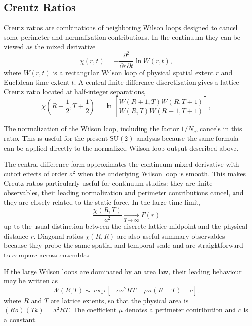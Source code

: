 \documentclass[12pt,a4paper,oneside,numbers=noenddot]{scrreprt}
\newcommand{\SU}{\mathrm{SU}}
\newcommand{\latspacing}{a}
\newcommand{\stringtension}{\sigma}
\begin{document}
\subsection{Creutz Ratios}
\label{subsec:creutz-ratios}

Creutz ratios are combinations of neighboring Wilson loops designed to cancel
some perimeter and normalization contributions. In the continuum they can be
viewed as the mixed derivative
\begin{equation}
  \chi(r,t)
  =
  -
  \frac{\partial^2}{\partial r\,\partial t}
  \ln W(r,t),
  \label{eq:continuum-creutz-ratio}
\end{equation}
where $W(r,t)$ is a rectangular Wilson loop of physical spatial extent $r$ and
Euclidean time extent $t$. A central finite-difference discretization gives a
lattice Creutz ratio located at half-integer separations,
\begin{equation}
  \chi\left(R+\frac{1}{2},T+\frac{1}{2}\right)
  =
  \ln
  \left[
    \frac{
      W(R+1,T) W(R,T+1)
    }{
      W(R,T) W(R+1,T+1)
    }
  \right],
  \label{eq:creutz-ratio-central-difference}
\end{equation}

The normalization of the Wilson loop, including the factor $1/N_c$, cancels in
this ratio. This is useful for the present $\SU(2)$ analysis because the same
formula can be applied directly to the normalized Wilson-loop output described
above.

The central-difference form approximates the continuum mixed derivative with
cutoff effects of order $\latspacing^2$ when the underlying Wilson loop is
smooth. This makes Creutz ratios particularly useful for continuum studies:
they are finite observables, their leading normalization and perimeter
contributions cancel, and they are closely related to the static force. In the
large-time limit,
\begin{equation}
  \frac{\chi(R,T)}{\latspacing^2}
  \xrightarrow[T\to\infty]{}
  F(r)
\end{equation}
up to the usual distinction between the discrete lattice midpoint and the
physical distance $r$. Diagonal ratios $\chi(R,R)$ are also useful summary
observables because they probe the same spatial and temporal scale and are
straightforward to compare across ensembles \cite{Creutz1980,Risch2024SmearingContinuum}.

If the large Wilson loops are dominated by an area law, their leading behaviour
may be written as
\begin{equation}
  W(R,T)
  \sim
  \exp\!\left[
    -\stringtension \latspacing^2 R T
    - \mu \latspacing (R+T)
    - c
  \right],
  \label{eq:wilson-loop-area-law}
\end{equation}
where \(R\) and \(T\) are lattice extents, so that the physical area is
\((R\latspacing)(T\latspacing)=\latspacing^2RT\). The coefficient
\(\mu\) denotes a perimeter contribution and \(c\) is a constant.
\end{document}
